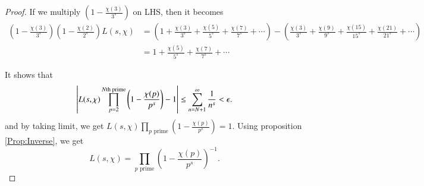 \documentclass[a4paper, 12pt]{article}
\theoremstyle{Mydefinition}
\theoremstyle{Mytheorem}
\begin{document}
\begin{proof}
If we multiply $\left(1-\frac{\chi(3)}{3^s}\right)$ on LHS, then it becomes
\begin{equation*}
\begin{split}
    \left(1-\frac{\chi(3)}{3^s}\right)\left(1-\frac{\chi(2)}{2^s}\right)L(s,\chi) &= \left(1+\frac{\chi(3)}{3^s}+\frac{\chi(5)}{5^s} + \frac{\chi(7)}{7^s}+\cdots\right) - \left(\frac{\chi(3)}{3^s}+\frac{\chi(9)}{9^s}+\frac{\chi(15)}{15^s} + \frac{\chi(21)}{21^s}+\cdots\right)\\
    &=1+\frac{\chi(5)}{5^s}+\frac{\chi(7)}{7^s}+\cdots
\end{split}
\end{equation*}

It shows that
\begin{equation*}
    \abs{L(s,\chi)\prod_{p=2}^{N\textrm{th prime}}\left(1-\frac{\chi(p)}{p^s}\right)-1}\leq \sum_{n=N+1}^\infty \frac{1}{n^s}<\epsilon.
\end{equation*}
and by taking limit, we get $L(s,\chi)\prod_{p\textrm{ prime}}\left(1-\frac{\chi(p)}{p^s}\right) = 1$. Using proposition \ref{Prop:Inverse}, we get
\begin{equation*}
    L(s,\chi) = \prod_{p\textrm{ prime}}\left(1-\frac{\chi(p)}{p^s}\right)^{-1}.
\end{equation*}
\end{proof}
\end{document}
